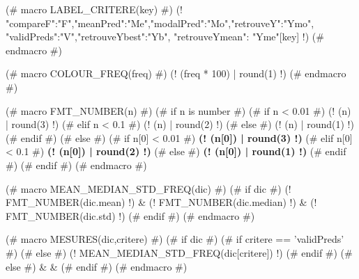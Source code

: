 (# macro LABEL_CRITERE(key) #)
{\small (! {"compareF":"F","meanPred":"Me","modalPred":"Mo","retrouveY":"Ymo",
"validPreds":"V","retrouveYbest":"Yb", "retrouveYmean": "Yme"}[key] !)  }
(# endmacro #)

(# macro COLOUR_FREQ(freq) #)
\textcolor[rgb]{ (! 2 * (1.1 - freq)  | round(3) !) , (! (2 * freq - 1.3) | round(3)  !) , 0.1}{(! (freq * 100) | round(1) !)}
(# endmacro #)

(# macro FMT_NUMBER(n) #)
    (# if n is number #)
(# if n < 0.01 #)
(! (n) | round(3) !)
(# elif n < 0.1 #)
(! (n) | round(2) !)
(# else #)
(! (n) | round(1) !)
(# endif #)
    (# else #)
(# if n[0] < 0.01 #)
\textbf{ (! (n[0]) | round(3) !)}
(# elif n[0] < 0.1 #)
\textbf{ (! (n[0]) | round(2) !)}
(# else #)
\textbf{ (! (n[0]) | round(1) !)}
(# endif #)
    (# endif #)
(# endmacro #)


(#  macro MEAN_MEDIAN_STD_FREQ(dic) #)
    (# if dic #)
    (! FMT_NUMBER(dic.mean) !) & {\footnotesize (! FMT_NUMBER(dic.median) !)} & {\footnotesize (! FMT_NUMBER(dic.std)  !) }
    (# endif #)
(# endmacro #)


(#  macro MESURES(dic,critere) #)
(# if dic #)
    (# if critere == 'validPreds' #)
    (# else #)
    (!  MEAN_MEDIAN_STD_FREQ(dic[critere]) !)
    (# endif #)
(# else #)
& &
(# endif #)
(# endmacro #)
